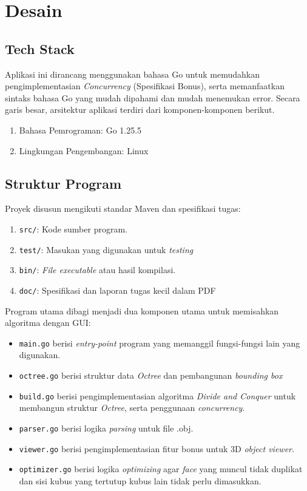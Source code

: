 \section{Desain}\label{sec:Desain} %
\subsection{Tech Stack}\label{sub:Tech Stack} %
Aplikasi ini dirancang menggunakan bahasa Go untuk memudahkan
pengimplementasian \textit{Concurrency} (Spesifikasi Bonus), serta
memanfaatkan sintaks bahasa Go yang mudah dipahami dan mudah
menemukan error. Secara garis besar, arsitektur aplikasi terdiri dari
komponen-komponen berikut.
\begin{enumerate}
    \item Bahasa Pemrograman: Go 1.25.5
    \item Lingkungan Pengembangan: Linux
\end{enumerate}

\subsection{Struktur Program}\label{sub:Struktur Program} %
Proyek disusun mengikuti standar Maven dan spesifikasi tugas:
\begin{enumerate}
    \item \texttt{src/}: Kode sumber program.
    \item \texttt{test/}: Masukan yang digunakan untuk \textit{testing}
    \item \texttt{bin/}: \textit{File executable} atau hasil kompilasi.
    \item \texttt{doc/}: Spesifikasi dan laporan tugas kecil dalam PDF
\end{enumerate}
Program utama dibagi menjadi dua komponen utama untuk memisahkan
algoritma dengan GUI:
\begin{itemize}
    \item \texttt{main.go} berisi \textit{entry-point} program yang memanggil fungsi-fungsi lain yang digunakan.
    \item \texttt{octree.go} berisi struktur data \textit{Octree} dan pembangunan \textit{bounding box}
    \item \texttt{build.go} berisi pengimplementasian algoritma \textit{Divide and Conquer} untuk membangun struktur \textit{Octree}, serta penggunaan \textit{concurrency}. 
    \item \texttt{parser.go} berisi logika \textit{parsing} untuk file .obj.
    \item \texttt{viewer.go} berisi pengimplementasian fitur bonus untuk 3D \textit{object viewer}.
    \item \texttt{optimizer.go} berisi logika \textit{optimizing} agar \textit{face} yang muncul tidak duplikat dan sisi kubus yang tertutup kubus lain tidak perlu dimasukkan.
\end{itemize}

